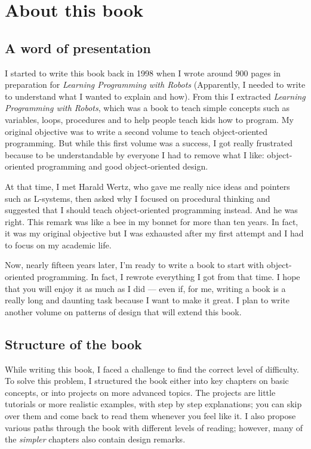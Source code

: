 \documentclass[10pt,twoside,english]{_support/latex/sbabook/sbabook}
\begin{document}
\frontmatter
\pagestyle{plain}

\tableofcontents*
\clearpage\listoffigures

\mainmatter

\chapter{About this book }\label{ch:about}\section{A word of presentation}
I started to write this book back in 1998 when I wrote around 900 pages in preparation for \textit{Learning Programming with Robots}
(Apparently, I needed to write to understand what I wanted to explain and how). From this I extracted \textit{Learning Programming with Robots}, which was a book to teach simple concepts such as variables, loops, procedures and to help people teach kids how to program. My original objective was to write a second volume to teach object-oriented programming. But while this first volume was a success, I got really frustrated because to be understandable by everyone I had to remove what I like: object-oriented programming and good object-oriented design. 

At that time, I met Harald Wertz, who gave me really nice ideas and pointers such as L-systems, then asked why I focused on procedural thinking and suggested that I should teach object-oriented programming instead. And he was right. This remark was like a bee in my bonnet for more than ten years.
In fact, it was my original objective but I was exhausted after my first attempt and I had to focus on my academic life.

Now, nearly fifteen years later, I'm ready to write a book to start with object-oriented programming. In fact, I rewrote everything I got from that time. 
I hope that you will enjoy it as much as I did — even if, for me, writing a book is a really long and daunting task because I want to make it great.
I plan to write another volume on patterns of design that will extend this book.
\section{Structure of the book}
While writing this book, I faced a challenge to find the correct level of difficulty.
To solve this problem, I structured the book either into key chapters on basic concepts, or into projects on more advanced topics.
The projects are little tutorials or more realistic examples, with step by step explanations; you can skip over them and come back to read them whenever you feel like it.
I also propose various paths through the book with different levels of reading; however, many of the \textit{simpler} chapters also contain design remarks.
\end{document}
